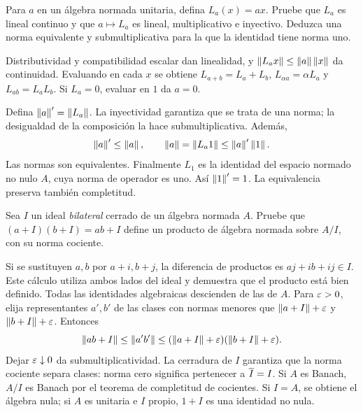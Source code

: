 \begin{ejercicio}\label{ej:v3-l19-3}
Para $a$ en un álgebra normada unitaria, defina $L_a(x)=ax$. Pruebe que $L_a$ es lineal continuo y que $a\mapsto L_a$ es lineal, multiplicativo e inyectivo. Deduzca una norma equivalente y submultiplicativa para la que la identidad tiene norma uno.
\end{ejercicio}
\begin{solucion}
Distributividad y compatibilidad escalar dan linealidad, y $\left\lVert L_ax\right\rVert\leq\left\lVert a\right\rVert\left\lVert x\right\rVert$ da continuidad. Evaluando en cada $x$ se obtiene $L_{a+b}=L_a+L_b$, $L_{\alpha a}=\alpha L_a$ y $L_{ab}=L_aL_b$. Si $L_a=0$, evaluar en $1$ da $a=0$.

Defina $\left\lVert a\right\rVert'=\left\lVert L_a\right\rVert$. La inyectividad garantiza que se trata de una norma; la desigualdad de la composición la hace submultiplicativa. Además,
\[
 \left\lVert a\right\rVert'\leq\left\lVert a\right\rVert,
 \qquad \left\lVert a\right\rVert=\left\lVert L_a1\right\rVert\leq\left\lVert a\right\rVert'\left\lVert1\right\rVert.
\]
Las normas son equivalentes. Finalmente $L_1$ es la identidad del espacio normado no nulo $A$, cuya norma de operador es uno. Así $\left\lVert1\right\rVert'=1$. La equivalencia preserva también completitud.
\end{solucion}

\begin{ejercicio}\label{ej:v3-l19-4}
Sea $I$ un ideal \emph{bilateral} cerrado de un álgebra normada $A$. Pruebe que $(a+I)(b+I)=ab+I$ define un producto de álgebra normada sobre $A/I$, con su norma cociente.
\end{ejercicio}
\begin{solucion}
Si se sustituyen $a,b$ por $a+i,b+j$, la diferencia de productos es $aj+ib+ij\in I$. Este cálculo utiliza ambos lados del ideal y demuestra que el producto está bien definido. Todas las identidades algebraicas descienden de las de $A$. Para $\varepsilon>0$, elija representantes $a',b'$ de las clases con normas menores que $\left\lVert a+I\right\rVert+\varepsilon$ y $\left\lVert b+I\right\rVert+\varepsilon$. Entonces
\[
 \left\lVert ab+I\right\rVert\leq\left\lVert a'b'\right\rVert
 \leq(\left\lVert a+I\right\rVert+\varepsilon)(\left\lVert b+I\right\rVert+\varepsilon).
\]
Dejar $\varepsilon\downarrow0$ da submultiplicatividad. La cerradura de $I$ garantiza que la norma cociente separa clases: norma cero significa pertenecer a $\overline{I}=I$. Si $A$ es Banach, $A/I$ es Banach por el teorema de completitud de cocientes. Si $I=A$, se obtiene el álgebra nula; si $A$ es unitaria e $I$ propio, $1+I$ es una identidad no nula.
\end{solucion}

